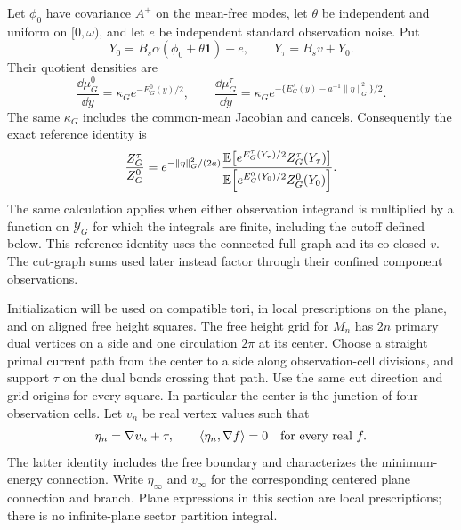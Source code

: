 Let \(\phi_0\) have covariance \(A^+\) on the mean-free modes,
let \(\theta\) be independent and uniform on \([0,\omega)\), and
let \(e\) be independent standard observation noise.  Put
\[
 Y_0=B_s\alpha(\phi_0+\theta\mathbf1)+e,\qquad
 Y_\tau=B_sv+Y_0 .
\]
Their quotient densities are
\[
 \frac{\dd\mu_G^0}{\dd y}
       =\kappa_Ge^{-E_G^0(y)/2},\qquad
 \frac{\dd\mu_G^\tau}{\dd y}
       =\kappa_G
          e^{-\{E_G^\tau(y)-a^{-1}\|\eta\|_G^2\}/2}.
\]
The same \(\kappa_G\) includes the common-mean Jacobian and cancels.
Consequently the exact reference identity is
\begin{equation}\label{eq:noisy-reference}
 \frac{Z_G^\tau}{Z_G^0}
 =e^{-\|\eta\|_G^2/(2a)}
 \frac{\mathbb E\!\left[e^{E_G^\tau(Y_\tau)/2}Z_G^\tau(Y_\tau)\right]}
      {\mathbb E\!\left[e^{E_G^0(Y_0)/2}Z_G^0(Y_0)\right]} .
\end{equation}
The same calculation applies when either observation integrand is
multiplied by a function on \(\mathcal Y_G\) for which the integrals
are finite, including the cutoff defined below.  This reference identity uses the connected full
graph and its co-closed \(v\).  The cut-graph sums used later instead
factor through their confined component observations.

Initialization will be used on compatible tori, in local prescriptions
on the plane, and on aligned free height squares.  The free height
grid for \(M_n\) has \(2n\) primary dual vertices on a side and one
circulation \(2\pi\) at its center.  Choose a straight primal current
path from the center to a side along observation-cell divisions, and
support \(\tau\) on the dual bonds crossing that path.  Use the same
cut direction and grid origins for every
square.  In particular the center is the junction of four observation
cells.  Let \(v_n\) be real vertex values such that
\[
       \eta_n=\nabla v_n+\tau,\qquad
       \langle \eta_n,\nabla f\rangle=0\quad\hbox{for every real }f.
\]
The latter identity includes the free boundary and characterizes the
minimum-energy connection.  Write \(\eta_\infty\) and \(v_\infty\) for
the corresponding centered plane connection and branch.  Plane
expressions in this section are local prescriptions; there is no
infinite-plane sector partition integral.

